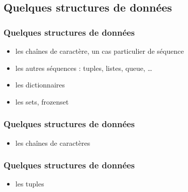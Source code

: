 
\subsection{Quelques structures de données}
\begin{frame}
  \frametitle{Quelques structures de données}
  \begin{itemize}
    \item<1-> les chaînes de caractère, un cas particulier de séquence
    \item<2-> les autres séquences : tuples, listes, queue, \ldots
    \item<3-> les dictionnaires
    \item<4-> les sets, frozenset
  \end{itemize}
\end{frame}

\begin{frame}[fragile]
  \frametitle{Quelques structures de données}
  \begin{itemize}
    \item les chaînes de caractères
  \end{itemize}
  \begin{ipython}
  \end{ipython}
\end{frame}

\begin{frame}[fragile]
  \frametitle{Quelques structures de données}
    \begin{itemize}
      \item les tuples
    \end{itemize}
    \begin{ipython}
    \end{ipython}
\end{frame}

